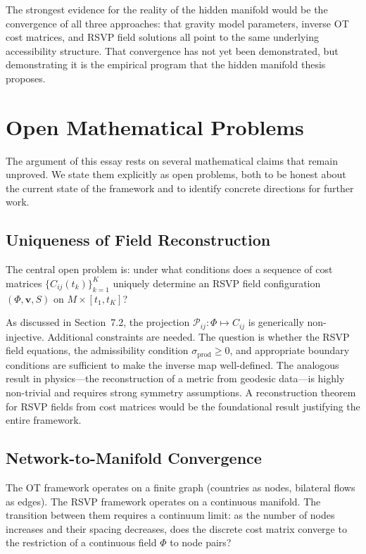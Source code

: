 \documentclass[12pt]{article}
\newcommand{\sigprod}{\sigma_{\mathrm{prod}}}
\begin{document}
The strongest evidence for the reality of the hidden manifold would be the convergence of all three approaches: that gravity model parameters, inverse OT cost matrices, and RSVP field solutions all point to the same underlying accessibility structure. That convergence has not yet been demonstrated, but demonstrating it is the empirical program that the hidden manifold thesis proposes.

\section{Open Mathematical Problems}

The argument of this essay rests on several mathematical claims that remain unproved. We state them explicitly as open problems, both to be honest about the current state of the framework and to identify concrete directions for further work.

\subsection{Uniqueness of Field Reconstruction}

The central open problem is: under what conditions does a sequence of cost matrices $\{C_{ij}(t_k)\}_{k=1}^K$ uniquely determine an RSVP field configuration $(\Phi, \mathbf{v}, S)$ on $M \times [t_1, t_K]$?

As discussed in Section~7.2, the projection $\mathcal{P}_{ij}: \Phi \mapsto C_{ij}$ is generically non-injective. Additional constraints are needed. The question is whether the RSVP field equations, the admissibility condition $\sigprod \geq 0$, and appropriate boundary conditions are sufficient to make the inverse map well-defined. The analogous result in physics---the reconstruction of a metric from geodesic data---is highly non-trivial and requires strong symmetry assumptions. A reconstruction theorem for RSVP fields from cost matrices would be the foundational result justifying the entire framework.

\subsection{Network-to-Manifold Convergence}

The OT framework operates on a finite graph (countries as nodes, bilateral flows as edges). The RSVP framework operates on a continuous manifold. The transition between them requires a continuum limit: as the number of nodes increases and their spacing decreases, does the discrete cost matrix converge to the restriction of a continuous field $\Phi$ to node pairs?
\end{document}
